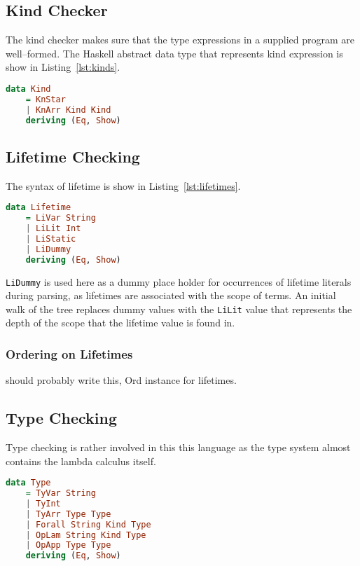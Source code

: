 \subsection{Kind Checker}
The kind checker makes sure that the type expressions in a supplied program are
well--formed. The Haskell abstract data type that represents kind expression is
show in Listing~\ref{lst:kinds}.

\begin{lstlisting}[caption=Haskell representation of Kinds., language=Haskell, label={lst:kinds}]
data Kind
    = KnStar
    | KnArr Kind Kind
    deriving (Eq, Show)
\end{lstlisting}

\subsection{Lifetime Checking}
The syntax of lifetime is show in Listing~\ref{lst:lifetimes}. 

\begin{lstlisting}[caption=Haskell representation of Lifetimes.., language=Haskell, label={lst:lifetimes}]
data Lifetime 
    = LiVar String
    | LiLit Int
    | LiStatic
    | LiDummy
    deriving (Eq, Show)
\end{lstlisting}

\lstinline{LiDummy} is used here as a dummy place holder for occurrences of
lifetime literals during parsing, as lifetimes are associated with the scope of
terms. An initial walk of the tree replaces dummy values with the
\lstinline{LiLit} value that represents the depth of the scope that the
lifetime value is found in.

\subsubsection{Ordering on Lifetimes}
should probably write this, Ord instance for lifetimes.

\subsection{Type Checking}
Type checking is rather involved in this this language as the type system
almost contains the lambda calculus itself.

\begin{lstlisting}[caption=Haskell representation of Types., language=Haskell, label={lst:types}]
data Type
    = TyVar String
    | TyInt
    | TyArr Type Type
    | Forall String Kind Type
    | OpLam String Kind Type
    | OpApp Type Type
    deriving (Eq, Show)
\end{lstlisting}

